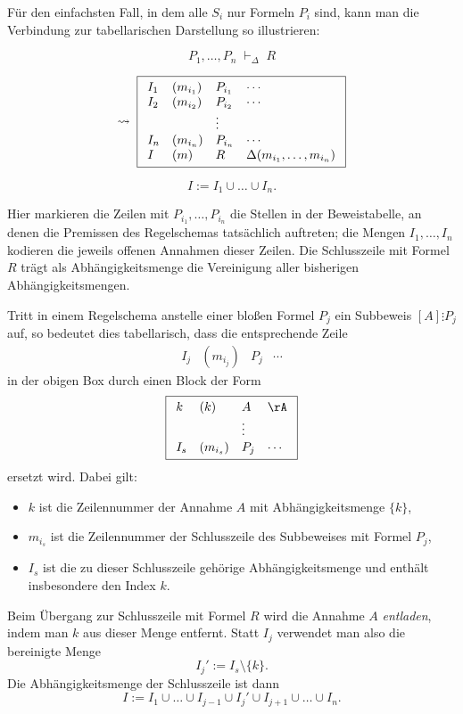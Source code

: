 \documentclass[main.tex]{subfiles}
\begin{document}
Für den einfachsten Fall, in dem alle \(S_i\) nur Formeln \(P_i\) sind,
kann man die Verbindung zur tabellarischen Darstellung so illustrieren:

\begin{RuleSchema}
\[
P_1,\dots,P_n \;\vdash_\Delta\; R
\]

\[
\leadsto\;
\boxed{%
  \begin{array}{llll}
    I_1&(m_{i_1})&P_{i_1}&\cdots \\
    I_2&(m_{i_2})&P_{i_2}&\cdots \\
       &        &\vdots  &        \\
    I_n&(m_{i_n})&P_{i_n}&\cdots \\
    I  &(m)      &R      &\Delta(m_{i_1},\dots,m_{i_n}) \\
  \end{array}
}
\]

\[
I := I_1 \cup \dots \cup I_n.
\]
\end{RuleSchema}

Hier markieren die Zeilen mit \(P_{i_1},\dots,P_{i_n}\) die Stellen in
der Beweistabelle, an denen die Premissen des Regelschemas tatsächlich
auftreten; die Mengen \(I_1,\dots,I_n\) kodieren die jeweils offenen
Annahmen dieser Zeilen. Die Schlusszeile mit Formel \(R\) trägt als
Abhängigkeitsmenge die Vereinigung aller bisherigen Abhängigkeitsmengen.

Tritt in einem Regelschema anstelle einer bloßen Formel \(P_j\) ein
Subbeweis \([A]\vdots P_j\) auf, so bedeutet dies tabellarisch, dass
die entsprechende Zeile
\[
  \begin{array}{llll}
    I_j & (m_{i_j}) & P_j & \cdots
  \end{array}
\]
in der obigen Box durch einen Block der Form
\[
\boxed{%
  \begin{array}{llll}
    k   & (k)       & A   & \rA   \\[0.2ex]
        &           &\vdots&      \\[0.2ex]
    I_s & (m_{i_s}) & P_j & \cdots
  \end{array}
}
\]
ersetzt wird. Dabei gilt:
\begin{itemize}
  \item \(k\) ist die Zeilennummer der Annahme \(A\) mit
        Abhängigkeitsmenge \(\{k\}\),
  \item \(m_{i_s}\) ist die Zeilennummer der Schlusszeile des Subbeweises
        mit Formel \(P_j\),
  \item \(I_s\) ist die zu dieser Schlusszeile gehörige
        Abhängigkeitsmenge und enthält insbesondere den Index \(k\).
\end{itemize}
Beim Übergang zur Schlusszeile mit Formel \(R\) wird die Annahme
\(A\) \emph{entladen}, indem man \(k\) aus dieser Menge entfernt.
Statt \(I_j\) verwendet man also die bereinigte Menge
\[
  I_j' := I_s \setminus \{k\}.
\]
Die Abhängigkeitsmenge der Schlusszeile ist dann
\[
  I := I_1 \cup \dots \cup I_{j-1} \cup I_j' \cup I_{j+1} \cup \dots \cup I_n.
\]
\end{document}
